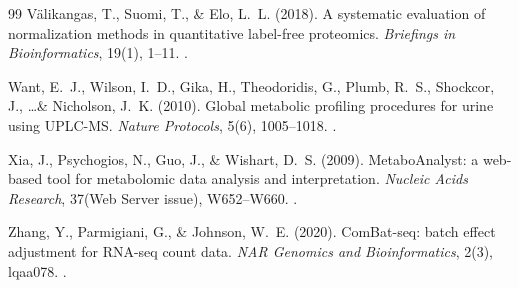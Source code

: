 \documentclass[11pt,oneside]{book}
\begin{document}
\begin{thebibliography}{99}
V\"alikangas, T., Suomi, T., \& Elo, L.~L. (2018). A systematic evaluation of normalization methods in quantitative label-free proteomics. \textit{Briefings in Bioinformatics}, 19(1), 1--11. .

Want, E.~J., Wilson, I.~D., Gika, H., Theodoridis, G., Plumb, R.~S., Shockcor, J., \dots \& Nicholson, J.~K. (2010). Global metabolic profiling procedures for urine using UPLC-MS. \textit{Nature Protocols}, 5(6), 1005--1018. .

Xia, J., Psychogios, N., Guo, J., \& Wishart, D.~S. (2009). MetaboAnalyst: a web-based tool for metabolomic data analysis and interpretation. \textit{Nucleic Acids Research}, 37(Web Server issue), W652--W660. .

Zhang, Y., Parmigiani, G., \& Johnson, W.~E. (2020). ComBat-seq: batch effect adjustment for RNA-seq count data. \textit{NAR Genomics and Bioinformatics}, 2(3), lqaa078. .

\end{thebibliography}
\end{document}
